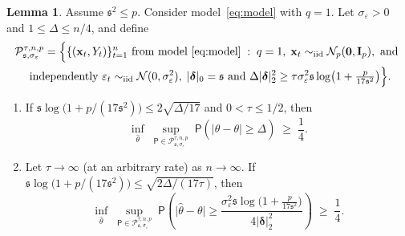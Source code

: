 \documentclass[11pt, a4paper]{article}
\newcommand{\mbf}{\mathbf}
\newcommand{\mc}{\mathcal}
\newcommand{\vep}{\varepsilon}
\renewcommand{\l}{\left}
\renewcommand{\r}{\right}
\def\wh{\widehat}
\newcommand{\p}{\mathsf{P}}
\newcommand{\iid}{\text{\upshape iid}}
\theoremstyle{definition}
\theoremstyle{definition}
\theoremstyle{definition}
\newtheorem{lem}[thm]{Lemma}
\theoremstyle{definition}
\theoremstyle{definition}
\theoremstyle{remark}
\theoremstyle{definition}
\theoremstyle{definition}
\theoremstyle{definition}
\begin{document}
\begin{lem}\label{lem:lb:id}
Assume $\mathfrak{s}^2 \le p$. Consider model~\eqref{eq:model} with $q = 1$.
Let $\sigma_{\vep}>0$ and $1 \le \Delta \le n/4$, and define
\begin{multline*}
\mc P_{\mathfrak{s}, \sigma_{\vep}}^{\tau, n, p} = \Bigl\{ \{(\mbf x_t, Y_t)\}_{t = 1}^n \text{ from model~\eqref{eq:model}} \;:\; q = 1,\;\mbf x_t \sim_{\iid} \mc N_p(\bm0, \mbf I_p), \text{ and }\\
\text{ independently }  \vep_t \sim_{\iid}\mc N (0,\sigma_{\vep}^2), \; \vert\bm\delta\vert_0 = \mathfrak{s}
\text{ and } \Delta\vert\bm\delta\vert_2^2 \ge \tau \sigma_{\vep}^2\mathfrak{s} \log\bigl(1 + \tfrac{p}{17 \mathfrak{s}^2}\bigr)\Bigr\}. 
\end{multline*} 

\begin{enumerate}[label = (\roman*)]
\item\label{lem:lb:id:detect}
If $\mathfrak{s}\log\bigl(1 + {p}/({17\mathfrak{s}^2})\bigr) \le {2}\sqrt{{\Delta}/{17}}$ and $0< \tau \le {1}/{2}$, then
$$
\inf_{\wh\theta}\; \sup_{\p \in \mc P_{\mathfrak{s}, \sigma_{\vep}}^{\tau, n, p}} \;\p\l(\bigl\vert\wh\theta -\theta\bigr\vert \ge {\Delta}\r)\; \ge\; \frac{1}{4}.
$$   
\item\label{lem:lb:id:locate}
Let $\tau \to \infty$ (at an arbitrary rate) as $n\to \infty$. If $\mathfrak{s}\log\bigl(1 + {p}/({17\mathfrak{s}^2})\bigr) \le \sqrt{{2\Delta}/({17\tau})}$, then
\[
\inf_{\wh\theta}\; \sup_{\p \in \mc P_{\mathfrak{s}, \sigma_{\vep}}^{\tau, n, p}} \;\p\l(\bigl\vert\wh\theta -\theta\bigr\vert \ge \frac{ \sigma_{\vep}^2\mathfrak{s} \log\bigl(1 + \tfrac{p}{17\mathfrak{s}^2}\bigr)}{4\vert\bm\delta\vert_2^2}\r)\; \ge\; \frac{1}{4}.
\]
\end{enumerate}
\end{lem}
\end{document}
